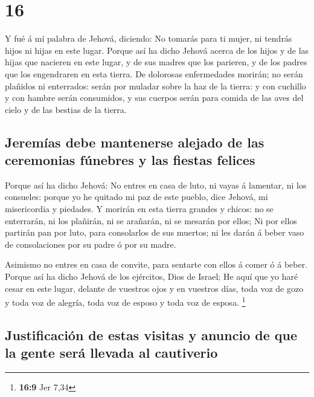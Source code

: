 \hypertarget{section-15}{%
\section{16}\label{section-15}}

 Y fué á mí palabra de Jehová, diciendo:  No
tomarás para ti mujer, ni tendrás hijos ni hijas en este lugar.
 Porque así ha dicho Jehová acerca de los hijos y de las
hijas que nacieren en este lugar, y de sus madres que los parieren, y de
los padres que los engendraren en esta tierra.  De
dolorosas enfermedades morirán; no serán plañidos ni enterrados: serán
por muladar sobre la haz de la tierra: y con cuchillo y con hambre serán
consumidos, y sus cuerpos serán para comida de las aves del cielo y de
las bestias de la tierra.

\hypertarget{jeremuxedas-debe-mantenerse-alejado-de-las-ceremonias-fuxfanebres-y-las-fiestas-felices}{%
\subsection{Jeremías debe mantenerse alejado de las ceremonias fúnebres
y las fiestas
felices}\label{jeremuxedas-debe-mantenerse-alejado-de-las-ceremonias-fuxfanebres-y-las-fiestas-felices}}

 Porque así ha dicho Jehová: No entres en casa de luto, ni
vayas á lamentar, ni los consueles: porque yo he quitado mi paz de este
pueblo, dice Jehová, mi misericordia y piedades.  Y
morirán en esta tierra grandes y chicos: no se enterrarán, ni los
plañirán, ni se arañarán, ni se mesarán por ellos;  Ni por
ellos partirán pan por luto, para consolarlos de sus muertos; ni les
darán á beber vaso de consolaciones por su padre ó por su madre.

 Asimismo no entres en casa de convite, para sentarte con
ellos á comer ó á beber.  Porque así ha dicho Jehová de
los ejércitos, Dios de Israel; He aquí que yo haré cesar en este lugar,
delante de vuestros ojos y en vuestros días, toda voz de gozo y toda voz
de alegría, toda voz de esposo y toda voz de esposa. \footnote{\textbf{16:9}
  Jer 7,34}

\hypertarget{justificaciuxf3n-de-estas-visitas-y-anuncio-de-que-la-gente-seruxe1-llevada-al-cautiverio}{%
\subsection{Justificación de estas visitas y anuncio de que la gente
será llevada al
cautiverio}\label{justificaciuxf3n-de-estas-visitas-y-anuncio-de-que-la-gente-seruxe1-llevada-al-cautiverio}}

